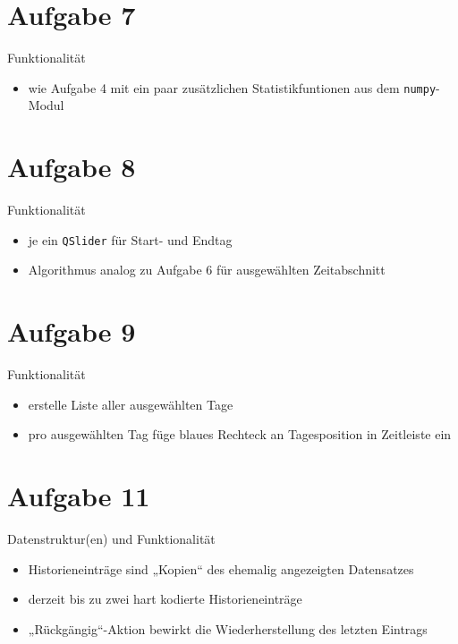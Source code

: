 \documentclass{beamer}
\begin{document}
    \section{Aufgabe 7}
    \begin{frame}{Funktionalität}
    	\begin{itemize}
    		\setlength\itemsep{1em}
    		\item wie Aufgabe 4 mit ein paar zusätzlichen Statistikfuntionen aus dem \lstinline{numpy}-Modul
    	\end{itemize}
    \end{frame}

    \section{Aufgabe 8}
    \begin{frame}{Funktionalität}
    	\begin{itemize}
    		\setlength\itemsep{1em}
    		\item je ein \lstinline{QSlider} für Start- und Endtag
    		\item Algorithmus analog zu Aufgabe 6 für ausgewählten Zeitabschnitt
    	\end{itemize}
    \end{frame}

    \section{Aufgabe 9}
    \begin{frame}{Funktionalität}
    	\begin{itemize}
    		\setlength\itemsep{1em}
    		\item erstelle Liste aller ausgewählten Tage
    		\item pro ausgewählten Tag füge blaues Rechteck an Tagesposition in Zeitleiste ein
    	\end{itemize}
    \end{frame}

    \section{Aufgabe 11}
    \begin{frame}{Datenstruktur(en) und Funktionalität}
    	\begin{itemize}
    		\setlength\itemsep{1em}
    		\item Historieneinträge sind „Kopien“ des ehemalig angezeigten Datensatzes
    		\item derzeit bis zu zwei hart kodierte Historieneinträge
    		\item „Rückgängig“-Aktion bewirkt die Wiederherstellung des letzten Eintrags
    	\end{itemize}
    \end{frame}
\end{document}
